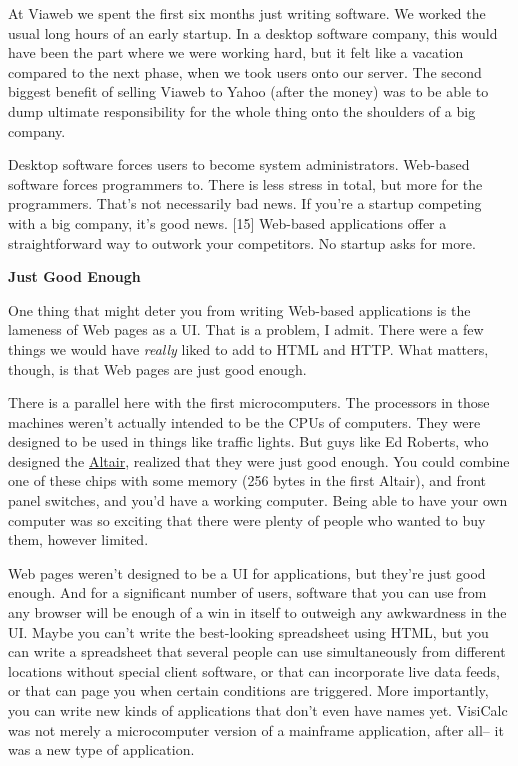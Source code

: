 At Viaweb we spent the first six months just writing software. We worked
the usual long hours of an early startup. In a desktop software company,
this would have been the part where we were working hard, but it felt
like a vacation compared to the next phase, when we took users onto our
server. The second biggest benefit of selling Viaweb to Yahoo (after the
money) was to be able to dump ultimate responsibility for the whole
thing onto the shoulders of a big company.

Desktop software forces users to become system administrators. Web-based
software forces programmers to. There is less stress in total, but more
for the programmers. That's not necessarily bad news. If you're a
startup competing with a big company, it's good news. {[}15{]} Web-based
applications offer a straightforward way to outwork your competitors. No
startup asks for more.

\textbf{Just Good Enough}

One thing that might deter you from writing Web-based applications is
the lameness of Web pages as a UI. That is a problem, I admit. There
were a few things we would have \emph{really} liked to add to HTML and
HTTP. What matters, though, is that Web pages are just good enough.

There is a parallel here with the first microcomputers. The processors
in those machines weren't actually intended to be the CPUs of computers.
They were designed to be used in things like traffic lights. But guys
like Ed Roberts, who designed the
\href{http://en.wikipedia.org/wiki/Altair_8800}{Altair}, realized that
they were just good enough. You could combine one of these chips with
some memory (256 bytes in the first Altair), and front panel switches,
and you'd have a working computer. Being able to have your own computer
was so exciting that there were plenty of people who wanted to buy them,
however limited.

Web pages weren't designed to be a UI for applications, but they're just
good enough. And for a significant number of users, software that you
can use from any browser will be enough of a win in itself to outweigh
any awkwardness in the UI. Maybe you can't write the best-looking
spreadsheet using HTML, but you can write a spreadsheet that several
people can use simultaneously from different locations without special
client software, or that can incorporate live data feeds, or that can
page you when certain conditions are triggered. More importantly, you
can write new kinds of applications that don't even have names yet.
VisiCalc was not merely a microcomputer version of a mainframe
application, after all-- it was a new type of application.

